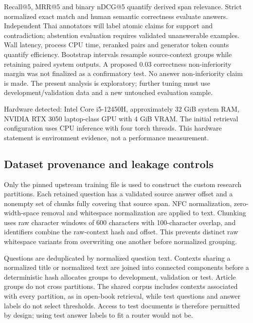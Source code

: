 \documentclass[10pt,a4paper]{article}
\begin{document}
Recall@5, MRR@5 and binary nDCG@5 quantify derived span relevance.
Strict normalized exact match and human semantic correctness evaluate
answers. Independent Thai annotators will label atomic claims for
support and contradiction; abstention evaluation requires validated
unanswerable examples. Wall latency, process CPU time, reranked pairs
and generator token counts quantify efficiency. Bootstrap intervals
resample source-context groups while retaining paired system outputs. A
proposed 0.03 correctness non-inferiority margin was not finalized as a
confirmatory test. No answer non-inferiority claim is made. The present
analysis is exploratory; further tuning must use development/validation
data and a new untouched evaluation sample.

Hardware detected: Intel Core i5-12450H, approximately 32 GiB system
RAM, NVIDIA RTX 3050 laptop-class GPU with 4 GiB VRAM. The initial
retrieval configuration uses CPU inference with four torch threads. This
hardware statement is environment evidence, not a performance
measurement.

\hypertarget{dataset-provenance-and-leakage-controls}{%
\subsection{Dataset provenance and leakage
controls}\label{dataset-provenance-and-leakage-controls}}

Only the pinned upstream training file is used to construct the custom
research partitions. Each retained question has a validated source
answer offset and a nonempty set of chunks fully covering that source
span. NFC normalization, zero-width-space removal and whitespace
normalization are applied to text. Chunking uses raw character windows
of 600 characters with 100-character overlap, and identifiers combine
the raw-context hash and offset. This prevents distinct raw whitespace
variants from overwriting one another before normalized grouping.

Questions are deduplicated by normalized question text. Contexts sharing
a normalized title or normalized text are joined into connected
components before a deterministic hash allocates groups to development,
validation or test. Article groups do not cross partitions. The shared
corpus includes contexts associated with every partition, as in
open-book retrieval, while test questions and answer labels do not
select thresholds. Access to test documents is therefore permitted by
design; using test answer labels to fit a router would not be.
\end{document}
